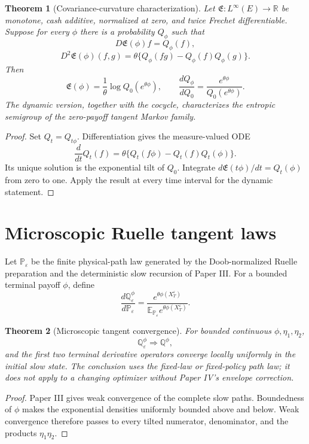 \documentclass[11pt,reqno]{amsart}
\newtheorem{theorem}{Theorem}[section]
\theoremstyle{definition}
\theoremstyle{remark}
\newcommand{\E}{\mathbb E}
\newcommand{\Pp}{\mathbb P}
\newcommand{\Qp}{\mathbb Q}
\newcommand{\R}{\mathbb R}
\begin{document}
\begin{theorem}[Covariance-curvature characterization]\label{thm:characterization}
Let $\mathfrak E:L^\infty(E)\to\R$ be monotone, cash additive, normalized at
zero, and twice Frechet differentiable.  Suppose for every $\phi$ there is a
probability $Q_\phi$ such that
\[
 D\mathfrak E(\phi)f=Q_\phi(f),
\]
\[
 D^2\mathfrak E(\phi)(f,g)
 =\theta\{Q_\phi(fg)-Q_\phi(f)Q_\phi(g)\}.
\]
Then
\[
 \mathfrak E(\phi)
 =\frac1\theta\log Q_0(e^{\theta\phi}),
 \qquad
 \frac{dQ_\phi}{dQ_0}
 =\frac{e^{\theta\phi}}{Q_0(e^{\theta\phi})}.
\]
The dynamic version, together with the cocycle, characterizes the entropic
semigroup of the zero-payoff tangent Markov family.
\end{theorem}
\begin{proof}
Set $Q_t=Q_{t\phi}$.  Differentiation gives the measure-valued ODE
\[
 \frac d{dt}Q_t(f)
 =\theta\{Q_t(f\phi)-Q_t(f)Q_t(\phi)\}.
\]
Its unique solution is the exponential tilt of $Q_0$.  Integrate
$d\mathfrak E(t\phi)/dt=Q_t(\phi)$ from zero to one.  Apply the result at every
time interval for the dynamic statement.
\end{proof}

\section{Microscopic Ruelle tangent laws}\label{sec:micro}
Let $\Pp_\varepsilon$ be the finite physical-path law generated by the
Doob-normalized Ruelle preparation and the deterministic slow recursion of
Paper III.  For a bounded terminal payoff $\phi$, define
\[
 \frac{d\Qp_\varepsilon^\phi}{d\Pp_\varepsilon}
 =\frac{e^{\theta\phi(X_T^\varepsilon)}}
 {\E_{\Pp_\varepsilon}e^{\theta\phi(X_T^\varepsilon)}}.
\]

\begin{theorem}[Microscopic tangent convergence]\label{thm:micro-conv}
For bounded continuous $\phi,\eta_1,\eta_2$,
\[
 \Qp_\varepsilon^\phi\Longrightarrow\Qp^\phi,
\]
and the first two terminal derivative operators converge locally uniformly in
the initial slow state.  The conclusion uses the fixed-law or fixed-policy
path law; it does not apply to a changing optimizer without Paper IV's envelope
correction.
\end{theorem}
\begin{proof}
Paper III gives weak convergence of the complete slow paths.  Boundedness of
$\phi$ makes the exponential densities uniformly bounded above and below.
Weak convergence therefore passes to every tilted numerator, denominator, and
the products $\eta_1\eta_2$.
\end{proof}
\end{document}
